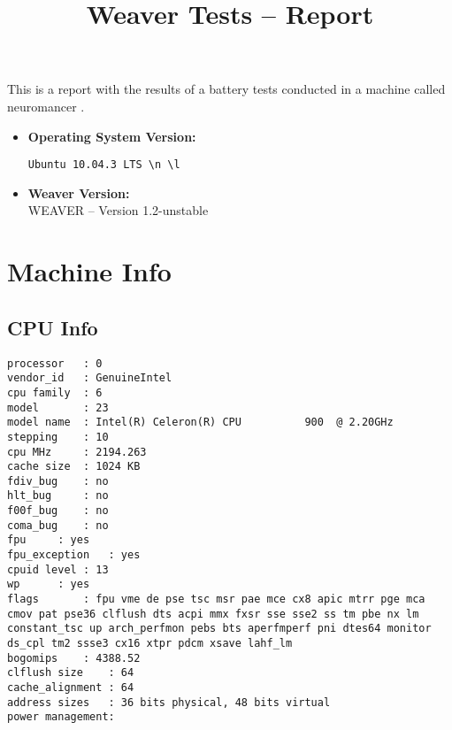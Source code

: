 \documentclass{article}
\title{Weaver Tests -- Report}
\begin{document}
\maketitle
This is a report with the results of a battery
tests conducted in a machine called 
neuromancer
.
\begin{itemize}
\item
\textbf{Operating System Version: }
\begin{verbatim}
Ubuntu 10.04.3 LTS \n \l

\end{verbatim}
\item
\textbf{Weaver Version: }\\
WEAVER -- Version 1.2-unstable
\end{itemize}
\section{Machine Info}
\subsection{CPU Info}
\begin{verbatim}
processor	: 0
vendor_id	: GenuineIntel
cpu family	: 6
model		: 23
model name	: Intel(R) Celeron(R) CPU          900  @ 2.20GHz
stepping	: 10
cpu MHz		: 2194.263
cache size	: 1024 KB
fdiv_bug	: no
hlt_bug		: no
f00f_bug	: no
coma_bug	: no
fpu		: yes
fpu_exception	: yes
cpuid level	: 13
wp		: yes
flags		: fpu vme de pse tsc msr pae mce cx8 apic mtrr pge mca cmov pat pse36 clflush dts acpi mmx fxsr sse sse2 ss tm pbe nx lm constant_tsc up arch_perfmon pebs bts aperfmperf pni dtes64 monitor ds_cpl tm2 ssse3 cx16 xtpr pdcm xsave lahf_lm
bogomips	: 4388.52
clflush size	: 64
cache_alignment	: 64
address sizes	: 36 bits physical, 48 bits virtual
power management:

\end{verbatim}
\end{document}
